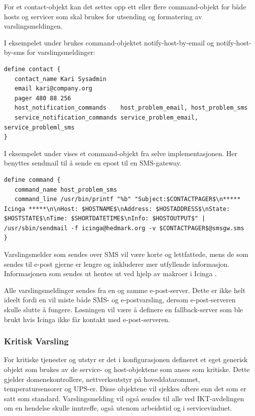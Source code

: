For et contact-objekt kan det settes opp ett eller flere command-objekt for både hosts og servicer som skal brukes for utsending og formatering av varslingsmeldingen.  

I eksempelet under brukes command-objektet notify-host-by-email og notify-host-by-sms for varslingsmeldinger:
\begin{lstlisting}
define contact {
   contact_name Kari Sysadmin
   email kari@company.org
   pager 480 88 256 
   host_notification_commands    host_problem_email, host_problem_sms
   service_notification_commands service_problem_email, service_probleml_sms
}
\end{lstlisting}

I eksempelet under vises et command-objekt fra selve implementasjonen. Her benyttes sendmail \cite{wiki:sendmail} til å sende en epost til en SMS-gateway.

\begin{lstlisting}
define command {
   command_name host_problem_sms
   command_line /usr/bin/printf "%b" "Subject:$CONTACTPAGER$\n***** Icinga *****\n\nHost: $HOSTNAME$\nAddress: $HOSTADDRESS$\nState: $HOSTSTATE$\nTime: $SHORTDATETIME$\nInfo: $HOSTOUTPUT$" | /usr/sbin/sendmail -f icinga@hedmark.org -v $CONTACTPAGER$@smsgw.sms
}
\end{lstlisting}

Varslingsmelder som sendes over SMS vil være korte og lettfattede, mens de som sendes til e-post gjerne er lengre og inkluderer mer utfyllende informasjon. Informasjonen som sendes ut hentes ut ved hjelp av makroer i Icinga \cite{icingamacro}. 

Alle varslingsmeldinger sendes fra en og samme e-post-server. Dette er ikke helt ideelt fordi en vil miste både SMS- og e-postvarsling, dersom e-post-serveren skulle slutte å fungere. Løsningen vil være å definere en fallback-server som ble brukt hvis Icinga ikke får kontakt med e-post-serveren. 

\subsubsection{Kritisk Varsling}

For kritiske tjenester og utstyr er det i konfigurasjonen defineret et eget generisk objekt som brukes av de service- og host-objektene som anses som kritiske. Dette gjelder domenekontrollere, nettverksutstyr på hoveddatarommet, temperatursensorer og UPS-er. Disse objektene vil sjekkes oftere enn det som er satt som standard. Varslingsmelding vil også sendes til alle ved IKT-avdelingen om en hendelse skulle inntreffe, også utenom arbeidstid og i servicevinduet.

